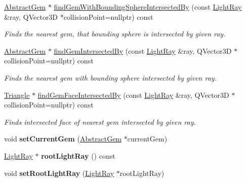 \begin{DoxyCompactItemize}
\item 
\hyperlink{class_abstract_gem}{Abstract\+Gem} $\ast$ \hyperlink{class_scene_af96ea722705769055ef2f9e9572f3fa0}{find\+Gem\+With\+Bounding\+Sphere\+Intersected\+By} (const \hyperlink{class_light_ray}{Light\+Ray} \&ray, Q\+Vector3\+D $\ast$collision\+Point=nullptr) const 
\begin{DoxyCompactList}\small\item\em Finds the nearest gem, that bounding sphere is intersected by given ray. \end{DoxyCompactList}\item 
\hyperlink{class_abstract_gem}{Abstract\+Gem} $\ast$ \hyperlink{class_scene_a2a2cee0a97d8436aac1cd582904af459}{find\+Gem\+Intersected\+By} (const \hyperlink{class_light_ray}{Light\+Ray} \&ray, Q\+Vector3\+D $\ast$collision\+Point=nullptr) const 
\begin{DoxyCompactList}\small\item\em Finds the nearest gem with bounding sphere intersected by given ray. \end{DoxyCompactList}\item 
\hyperlink{class_triangle}{Triangle} $\ast$ \hyperlink{class_scene_a2a06baa2386486f9276f97c47d76e624}{find\+Gem\+Face\+Intersected\+By} (const \hyperlink{class_light_ray}{Light\+Ray} \&ray, Q\+Vector3\+D $\ast$collision\+Point=nullptr) const 
\begin{DoxyCompactList}\small\item\em Finds intersected face of nearest gem intersected by given ray. \end{DoxyCompactList}\item 
\hypertarget{class_scene_afcaeead320358b9d9dd02a113ef97c44}{}void {\bfseries set\+Current\+Gem} (\hyperlink{class_abstract_gem}{Abstract\+Gem} $\ast$current\+Gem)\label{class_scene_afcaeead320358b9d9dd02a113ef97c44}

\item 
\hypertarget{class_scene_a7de6dcc38dd6398f71af71295ae09966}{}\hyperlink{class_light_ray}{Light\+Ray} $\ast$ {\bfseries root\+Light\+Ray} () const \label{class_scene_a7de6dcc38dd6398f71af71295ae09966}

\item 
\hypertarget{class_scene_a3da6be3089fe335bf628ef58d23cda18}{}void {\bfseries set\+Root\+Light\+Ray} (\hyperlink{class_light_ray}{Light\+Ray} $\ast$root\+Light\+Ray)\label{class_scene_a3da6be3089fe335bf628ef58d23cda18}

\end{DoxyCompactItemize}
